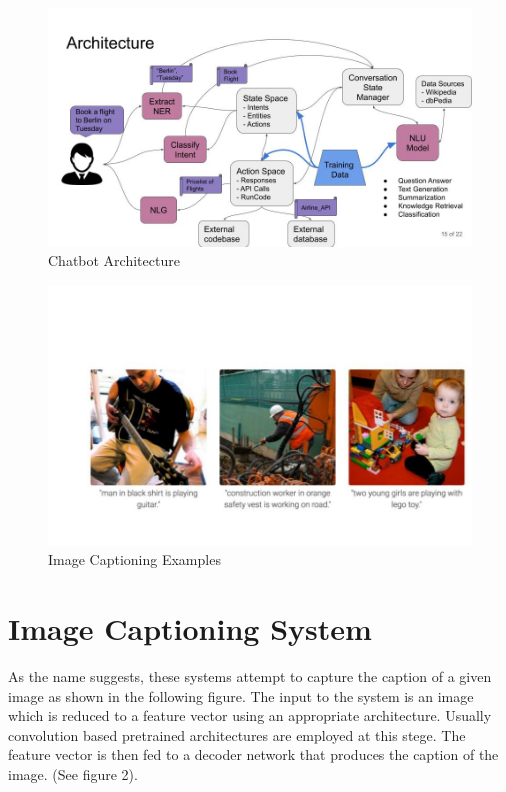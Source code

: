 \documentclass[]{krantz}
\begin{document}
\begin{figure}
\centering
\includegraphics{figures/04-01-use-case1/chatbot_arch.jpg}
\caption{Chatbot Architecture}
\end{figure}

\begin{figure}
\centering
\includegraphics{figures/04-01-use-case1/caption_example.jpg}
\caption{Image Captioning Examples}
\end{figure}

\hypertarget{image-captioning-system}{%
\section{Image Captioning System}\label{image-captioning-system}}

As the name suggests, these systems attempt to capture the caption of a given image as shown in the following figure. The input to the system is an image which is reduced to a feature vector using an appropriate architecture. Usually convolution based pretrained architectures are employed at this stege. The feature vector is then fed to a decoder network that produces the caption of the image. (See figure 2).
\end{document}
